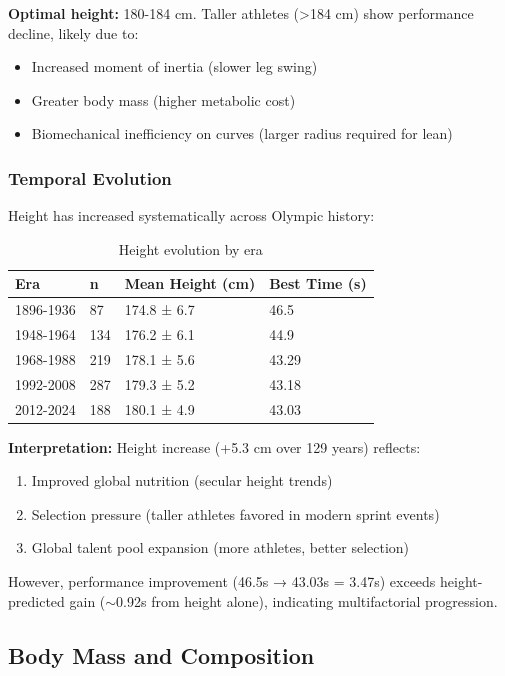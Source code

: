 \textbf{Optimal height:} 180-184 cm. Taller athletes (>184 cm) show performance decline, likely due to:
\begin{itemize}
    \item Increased moment of inertia (slower leg swing)
    \item Greater body mass (higher metabolic cost)
    \item Biomechanical inefficiency on curves (larger radius required for lean)
\end{itemize}

\subsubsection{Temporal Evolution}

Height has increased systematically across Olympic history:

\begin{table}[H]
\centering
\caption{Height evolution by era}
\begin{tabular}{@{}llll@{}}
\toprule
\textbf{Era} & \textbf{n} & \textbf{Mean Height (cm)} & \textbf{Best Time (s)} \\
\midrule
1896-1936 & 87 & 174.8 ± 6.7 & 46.5 \\
1948-1964 & 134 & 176.2 ± 6.1 & 44.9 \\
1968-1988 & 219 & 178.1 ± 5.6 & 43.29 \\
1992-2008 & 287 & 179.3 ± 5.2 & 43.18 \\
2012-2024 & 188 & 180.1 ± 4.9 & 43.03 \\
\bottomrule
\end{tabular}
\end{table}

\textbf{Interpretation:} Height increase (+5.3 cm over 129 years) reflects:
\begin{enumerate}
    \item Improved global nutrition (secular height trends)
    \item Selection pressure (taller athletes favored in modern sprint events)
    \item Global talent pool expansion (more athletes, better selection)
\end{enumerate}

However, performance improvement (46.5s → 43.03s = 3.47s) exceeds height-predicted gain ($\sim$0.92s from height alone), indicating multifactorial progression.

\subsection{Body Mass and Composition}

